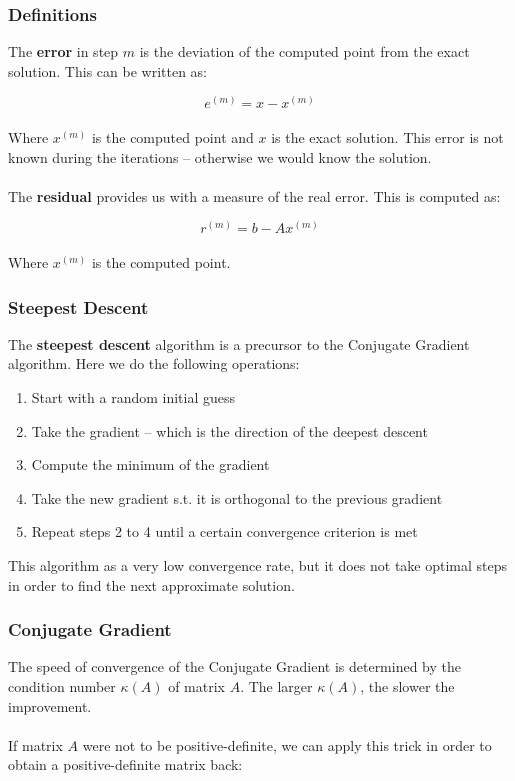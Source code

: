 \documentclass{article}
\begin{document}
\subsubsection{Definitions}
The \textbf{error} in step $m$ is the deviation of the computed point from the exact solution. This can be written as:

\[ e^{(m)} = x-x^{(m)} \] \\
Where $x^{(m)}$ is the computed point and $x$ is the exact solution. This error is not known during the iterations -- otherwise we would know the solution. \\ \\
The \textbf{residual} provides us with a measure of the real error. This is computed as:

\[ r^{(m)} = b-Ax^{(m)} \] \\
Where $x^{(m)}$ is the computed point.

\subsubsection{Steepest Descent}
The \textbf{steepest descent} algorithm is a precursor to the Conjugate Gradient algorithm. Here we do the following operations:

\begin{enumerate}
	\item Start with a random initial guess
	\item Take the gradient -- which is the direction of the deepest descent
	\item Compute the minimum of the gradient
	\item Take the new gradient s.t. it is orthogonal to the previous gradient
	\item Repeat steps 2 to 4 until a certain convergence criterion is met
\end{enumerate}
This algorithm as a very low convergence rate, but it does not take optimal steps in order to find the next approximate solution.

\subsubsection{Conjugate Gradient}
The speed of convergence of the Conjugate Gradient is determined by the condition number $\kappa(A)$ of matrix $A$. The larger $\kappa(A)$, the slower the improvement. \\ \\
If matrix $A$ were not to be positive-definite, we can apply this trick in order to obtain a positive-definite matrix back:
\end{document}

